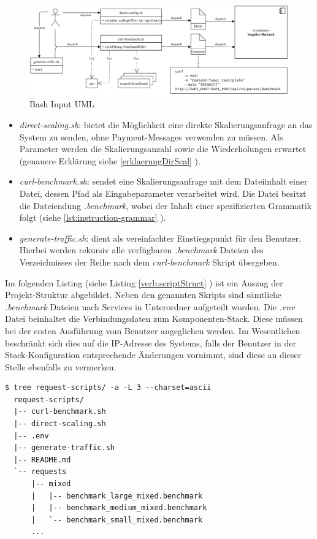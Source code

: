 \begin{figure}[ht!]
	\centering
	\includegraphics[width=\linewidth]{kapitel/problemloesung/implementierung/_img/input-uml}
	\caption[Bash Input UML]{Bash Input UML}
	\label{fig:bashOverview}
\end{figure}

\begin{itemize}
  \item \emph{direct-scaling.sh}: bietet die Möglichkeit eine direkte Skalierungsanfrage an das System zu senden, ohne Payment-Messages verwenden zu müssen. Als Parameter werden die Skalierungsanzahl sowie die Wiederholungen erwartet (genauere Erklärung siehe \ref{erklaerungDirScal} ).
  \item \emph{curl-benchmark.sh}: sendet eine Skalierungsanfrage mit dem Dateiinhalt einer Datei, dessen Pfad als Eingabeparameter verarbeitet wird. Die Datei besitzt die Dateiendung \emph{.benchmark}, wobei der Inhalt einer spezifizierten Grammatik folgt (siehe \ref{lst:instruction-grammar} ).
  \item \emph{generate-traffic.sh}: dient als vereinfachter Einstiegspunkt für den Benutzer. Hierbei werden rekursiv alle verfügbaren \emph{.benchmark} Dateien des Verzeichnisses der Reihe nach dem \emph{curl-benchmark} Skript übergeben.
\end{itemize}

Im folgenden Listing (siehe Listing \ref{verb:scriptStruct} ) ist ein Auszug der Projekt-Struktur abgebildet. Neben den genannten Skripts sind sämtliche \emph{.benchmark} Dateien nach Services in Unterordner aufgeteilt worden. Die \emph{.env} Datei beinhaltet die Verbindungsdaten zum Komponenten-Stack. Diese müssen bei der ersten Ausführung vom Benutzer angeglichen werden. Im Wesentlichen beschränkt sich dies auf die IP-Adresse des Systems, falls der Benutzer in der Stack-Konfiguration entsprechende Änderungen vornimmt, sind diese an dieser Stelle ebenfalls zu vermerken.

\label{verb:scriptStruct}
\begin{minipage}{\linewidth}
\begin{lstlisting}[caption={Bash Skript - Struktur},style=bashStyle]
  $ tree request-scripts/ -a -L 3 --charset=ascii
  request-scripts/
  |-- curl-benchmark.sh
  |-- direct-scaling.sh
  |-- .env
  |-- generate-traffic.sh
  |-- README.md
  `-- requests
      |-- mixed
      |   |-- benchmark_large_mixed.benchmark
      |   |-- benchmark_medium_mixed.benchmark
      |   `-- benchmark_small_mixed.benchmark
      ...
\end{lstlisting}
\end{minipage}

